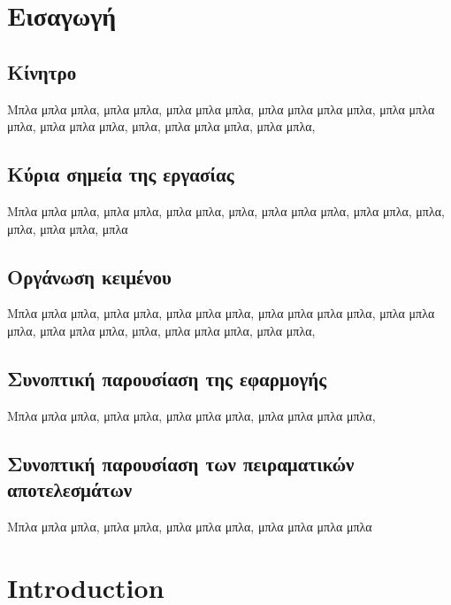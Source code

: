 \chapter{Εισαγωγή}


\section{Κίνητρο}
  Μπλα μπλα μπλα, μπλα μπλα, μπλα μπλα μπλα, μπλα μπλα μπλα μπλα,
  μπλα μπλα μπλα, μπλα μπλα μπλα, μπλα, μπλα μπλα μπλα, μπλα μπλα,

\section{Κύρια σημεία της εργασίας}
  Μπλα μπλα μπλα, μπλα μπλα, \nocite{*} μπλα μπλα, μπλα, μπλα μπλα
  μπλα, μπλα μπλα, μπλα, μπλα, μπλα μπλα, μπλα

\section{Οργάνωση κειμένου}
  Μπλα μπλα μπλα, μπλα μπλα, μπλα μπλα μπλα, μπλα μπλα μπλα μπλα,
  μπλα μπλα μπλα, μπλα μπλα μπλα, μπλα, μπλα μπλα μπλα, μπλα μπλα,

\section{Συνοπτική παρουσίαση της εφαρμογής}
  Μπλα μπλα μπλα, μπλα μπλα, μπλα μπλα μπλα, μπλα μπλα μπλα μπλα,

\section{Συνοπτική παρουσίαση των πειραματικών αποτελεσμάτων}
  Μπλα μπλα μπλα, μπλα μπλα, μπλα μπλα μπλα, μπλα μπλα μπλα μπλα

\setcounter{chapter}{0}

\chapter{Introduction}

